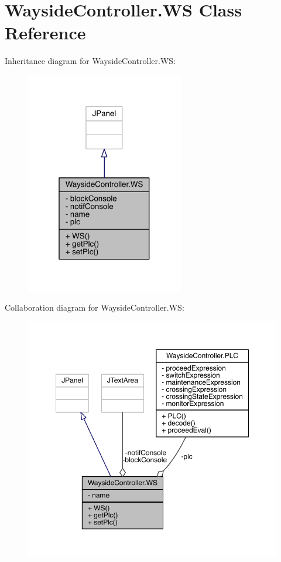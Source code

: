 \hypertarget{classWaysideController_1_1WS}{}\section{Wayside\+Controller.\+WS Class Reference}
\label{classWaysideController_1_1WS}


Inheritance diagram for Wayside\+Controller.\+WS\+:
\nopagebreak
\begin{figure}[H]
\begin{center}
\leavevmode
\includegraphics[width=196pt]{classWaysideController_1_1WS__inherit__graph}
\end{center}
\end{figure}


Collaboration diagram for Wayside\+Controller.\+WS\+:
\nopagebreak
\begin{figure}[H]
\begin{center}
\leavevmode
\includegraphics[width=350pt]{classWaysideController_1_1WS__coll__graph}
\end{center}
\end{figure}
